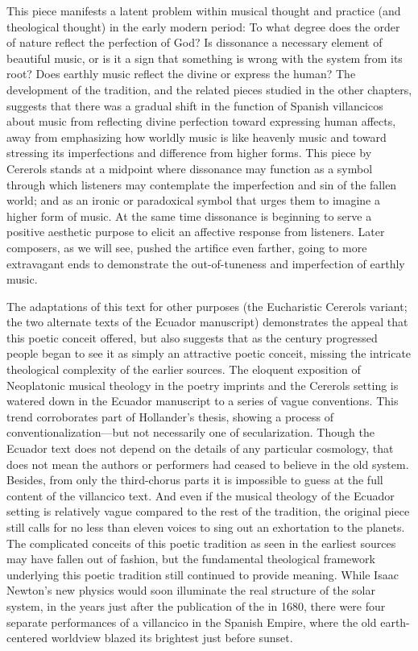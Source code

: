 This piece manifests a latent problem within musical thought and practice (and
theological thought) in the early modern period: To what degree does the order
of nature reflect the perfection of God?
Is dissonance a necessary element of beautiful music, or is it a sign that
something is wrong with the system from its root?  
Does earthly music reflect the divine or express the human?
The development of the  tradition, and the related
pieces studied in the other chapters, suggests that there was a gradual shift in
the function of Spanish villancicos about music from reflecting divine
perfection toward expressing human affects, away from emphasizing how worldly
music is like heavenly music and toward stressing its imperfections and
difference from higher forms.
This piece by Cererols stands at a midpoint where dissonance may function as a
symbol through which listeners may contemplate the imperfection and sin of the
fallen world; and as an ironic or paradoxical symbol that urges them to imagine
a higher form of music. 
At the same time dissonance is beginning to serve a positive aesthetic purpose
to elicit an affective response from listeners.
Later composers, as we will see, pushed the artifice even farther, going to more
extravagant ends to demonstrate the out-of-tuneness and imperfection of earthly
music.

The adaptations of this text for other purposes (the Eucharistic Cererols
variant; the two alternate texts of the Ecuador manuscript) demonstrates the
appeal that this poetic conceit offered, but also suggests that as the century
progressed people began to see it as simply an attractive poetic conceit,
missing the intricate theological complexity of the earlier sources.
The eloquent exposition of Neoplatonic musical theology in the poetry imprints
and the Cererols setting is watered down in the Ecuador manuscript to a series
of vague conventions.
This trend corroborates part of Hollander's thesis, showing a process of
conventionalization---but not necessarily one of secularization.  
Though the Ecuador text does not depend on the details of any particular
cosmology, that does not mean the authors or performers had ceased to believe in
the old system.
Besides, from only the third-chorus parts it is impossible to guess at the full
content of the villancico text.  And even if the musical theology of the Ecuador
setting is relatively vague compared to the rest of the tradition, the original
piece still calls for no less than eleven voices to sing out an exhortation to
the planets.
The complicated conceits of this poetic tradition as seen in the earliest
sources may have fallen out of fashion, but the fundamental theological
framework underlying this poetic tradition still continued to provide meaning.
While Isaac Newton's new physics would soon illuminate the real structure of the
solar system, in the years just after the publication of the  in 1680, there were four separate performances of a
 villancico in the Spanish Empire, where the old
earth-centered worldview blazed its brightest just before sunset.

\endinput

